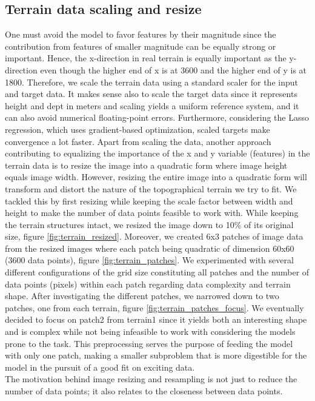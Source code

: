 \documentclass[11pt, a4paper]{article}
\begin{document}
\subsection*{Terrain data scaling and resize}
One must avoid the model to favor features by their magnitude since the contribution from features of smaller magnitude can be equally strong or important.
Hence, the x-direction in real terrain is equally important as the y-direction even though the higher end of x is at 3600 and the higher end of y is at 1800.
Therefore, we scale the terrain data using a standard scaler for the input and target data. It makes sense also to scale the target data since it represents
height and dept in meters and scaling yields a uniform reference system, and it can also avoid numerical floating-point errors. Furthermore, considering the Lasso regression,
which uses gradient-based optimization, scaled targets make convergence a lot faster.
Apart from scaling the data, another approach contributing to equalizing the importance of the x and y variable (features) in the terrain data is to resize the image into a
quadratic form where image height equals image width. However, resizing the entire image into a quadratic form will transform and distort the nature of the topographical
terrain we try to fit. We tackled this by first resizing while keeping the scale factor between width and height to make the number of data points feasible to work with.
While keeping the terrain structures intact, we resized the image down to 10\% of its original size, figure \ref{fig:terrain_resized}. Moreover, we created 6x3 patches of
image data from the resized images where each patch being quadratic of dimension 60x60 (3600 data points), figure \ref{fig:terrain_patches}. We experimented with several
different configurations of the grid size constituting all patches and the number of data points (pixels) within each patch regarding data complexity and terrain shape.
After investigating the different patches, we narrowed down to two patches, one from each terrain, figure \ref{fig:terrain_patches_focus}. We eventually decided to focus
on patch2 from terrain1 since it yields both an interesting shape and is complex while not being infeasible to work with considering the models prone to the task.
This preprocessing serves the purpose of feeding the model with only one patch, making a smaller subproblem that is more digestible for the model in the pursuit of a good
fit on exciting data.\\
The motivation behind image resizing and resampling is not just to reduce the number of data points; it also relates to the closeness between data points.
\end{document}
